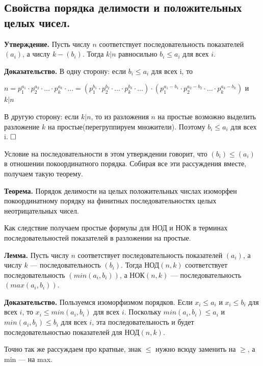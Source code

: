\documentclass[a4paper, 10pt]{article}
\begin{document}
\subsection{Свойства порядка делимости и положительных целых чисел.}

\textbf{Утверждение.} Пусть числу $n$ соответствует последовательность показателей $(a_i)$, а числу $k - (b_i)$. Тогда $k | n$ равносильно $b_i \leqslant a_i$ для всех $i$.

\textbf{Доказательство.} В одну сторону: если $b_i \leqslant a_i$ для всех i, то

\begin{center}
    $\displaystyle n = p_1^{a_1} \cdot p_2^{a_2} \cdot \dots \cdot p_k^{a_k} \cdot \dots = (p_1^{b_1} \cdot p_2^{b_2} \cdot \dots \cdot p_k^{b_k} \cdot \dots) \cdot (p_1^{a_1 - b_1} \cdot p_2^{a_2 - b_2} \cdot \dots \cdot p_k^{a_k - b_k})$ и $k | n$
\end{center}

В другую сторону: если $k | n$, то из разложения $n$ на простые возможно выделить разложение $k$ на простые(перегруппируем множители). Поэтому $b_i \leqslant a_i$ для всех i. $\hfill \square$

Условие на последовательности в этом утверждении говорит, что $(b_i) \leqslant (a_i)$ в отношении покоординатного порядка. Собирая все эти рассуждения вместе, получаем такую теорему.

\textbf{Теорема.} Порядок делимости на целых положительных числах изоморфен покоординатному порядку на финитных последовательностях целых неотрицательных чисел.

Как следствие получаем простые формулы для НОД и НОК в терминах последовательностей показателей в разложении на простые.

\medskip

\textbf{Лемма.} Пусть числу $n$ соответствует последовательность показателей $(a_i)$,
а числу $k$ — последовательность $(b_i)$. Тогда НОД$(n, k)$ соответствует последовательность $(min(a_i, b_i))$, а НОК$(n, k)$ — последовательность $(max(a_i, b_i))$.

\textbf{Доказательство.} Пользуемся изоморфизмом порядков. Если $x_i \leqslant a_i$ и $x_i \leqslant b_i$ для всех $i$, то $x_i \leqslant min(a_i, b_i)$ для всех $i$. Поскольку
$min(a_i, b_i) \leqslant a_i$ и $min(a_i, b_i) \leqslant b_i$ для всех $i$, эта последовательность и будет последовательностью показателей для НОД$(n, k)$.

Точно так же рассуждаем про кратные, знак $\leqslant$ нужно всюду заменить на $\geqslant$, а min — на max.
\end{document}
